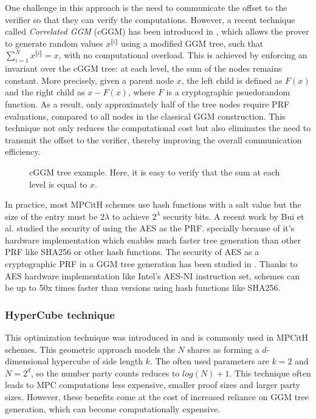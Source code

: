 \documentclass[english]{article}
\newcommand{\lir}{\llbracket i \rrbracket}
\begin{document}
		One challenge in this approach is the need to communicate the offset to the verifier so that they can verify the computations. However, a recent technique called \emph{Correlated GGM} (cGGM) has been introduced in \cite{GYWZ+22}, which allows the prover to generate random values $x^{\lir}$ using a modified GGM tree, such that $\sum_{i=1}^{N} x^{\lir} = x$, with no computational overload.
		This is achieved by enforcing an invariant over the cGGM tree: at each level, the sum of the nodes remains constant. More precisely, given a parent node $x$, the left child is defined as $F(x)$ and the right child as $x - F(x)$, where $F$ is a cryptographic psuedorandom function. As a result, only approximately half of the tree nodes require PRF evaluations, compared to all nodes in the classical GGM construction.
		This technique not only reduces the computational cost but also eliminates the need to transmit the offset to the verifier, thereby improving the overall communication efficiency.
		
		\begin{figure}[H]
		\begin{center}
			\caption{cGGM tree example. Here, it is easy to verify that the sum at each level is equal to $x$.}
			\label{fig:cGGMtree}
		\end{center}
		\end{figure}
		
		In practice, most MPCitH schemes use hash functions with a salt value but the size of the entry must be $2\lambda$ to achieve $2^{\lambda}$ security bits. A recent work by Bui et al. studied the security of using the AES as the PRF. specially because of it's hardware implementation which enables much faster tree generation than other PRF like SHA256 or other hash functions. The security of AES as a cryptographic PRF in a GGM tree generation has been studied in \cite{BCCG+24}. Thanks to AES hardware implementation like Intel's AES-NI instruction set, schemes can be up to 50x times faster than versions using hash functions like SHA256.
		
		\subsubsection{HyperCube technique}
 		This optimization technique was introduced in \cite{AGHH+22} and is commonly used in MPCitH schemes. This geometric approach models the $N$ shares as forming a $d$-dimensional hypercube of side length $k$. The often used parameters are $k = 2$ and $N = 2^d$, so the number party counts reduces to $log(N) + 1$. This technique often leads to MPC computations less expensive, smaller proof sizes and larger party sizes. However, these benefits come at the cost of increased reliance on GGM tree generation, which can become computationally expensive.
		
\end{document}
